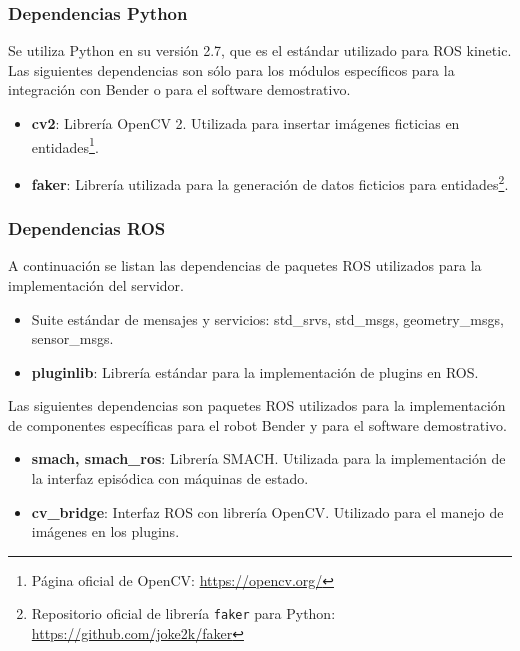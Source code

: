 \subsubsection{Dependencias Python}

Se utiliza Python en su versión 2.7, que es el estándar utilizado para ROS kinetic. Las siguientes dependencias son sólo para los módulos específicos para la integración con Bender o para el software demostrativo.

\begin{itemize}
\item {\bfseries cv2}: Librería OpenCV 2. Utilizada para insertar imágenes ficticias en entidades\footnote{Página oficial de OpenCV: \url{https://opencv.org/}}. 
\item {\bfseries faker}: Librería utilizada para la generación de datos ficticios para entidades\footnote{Repositorio oficial de librería \texttt{faker} para Python: \url{https://github.com/joke2k/faker}}.
\end{itemize}


\subsubsection{Dependencias ROS}

A continuación se listan las dependencias de paquetes ROS utilizados para la implementación del servidor.
\begin{itemize}
	\item Suite estándar de mensajes y servicios: std\_srvs, std\_msgs, geometry\_msgs, sensor\_msgs.
	\item {\bfseries pluginlib}: Librería estándar para la implementación de plugins en ROS.
\end{itemize}

Las siguientes dependencias son paquetes ROS utilizados para la implementación de componentes específicas para el robot Bender y para el software demostrativo.
\begin{itemize}
\item {\bfseries smach, smach\_ros}: Librería SMACH. Utilizada para la implementación de la interfaz episódica con máquinas de estado.
\item {\bfseries cv\_bridge}: Interfaz ROS con librería OpenCV. Utilizado para el manejo de imágenes en los plugins.
\end{itemize}


